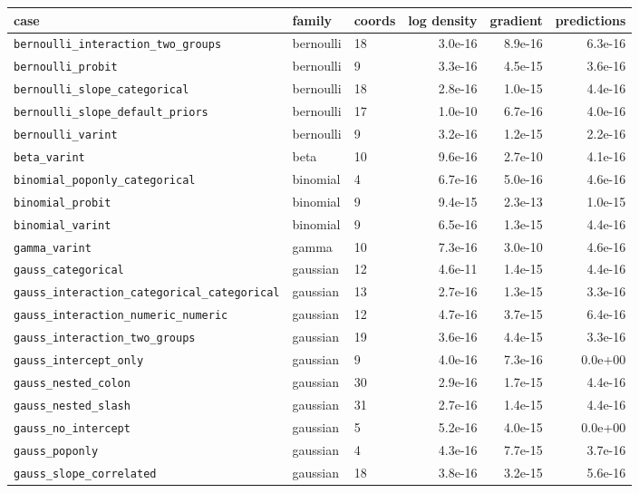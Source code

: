 \documentclass[11pt]{article}
\newcommand{\code}[1]{\texttt{#1}}
\begin{document}
\scriptsize\setlength{\tabcolsep}{4pt}
\begin{center}\begin{tabular}{@{}lllrrr@{}}
\toprule
case & family & coords & log density & gradient & predictions \\
\midrule
\code{bernoulli\_interaction\_two\_groups} & bernoulli & 18 & 3.0e-16 & 8.9e-16 & 6.3e-16 \\
\code{bernoulli\_probit} & bernoulli & 9 & 3.3e-16 & 4.5e-15 & 3.6e-16 \\
\code{bernoulli\_slope\_categorical} & bernoulli & 18 & 2.8e-16 & 1.0e-15 & 4.4e-16 \\
\code{bernoulli\_slope\_default\_priors} & bernoulli & 17 & 1.0e-10 & 6.7e-16 & 4.0e-16 \\
\code{bernoulli\_varint} & bernoulli & 9 & 3.2e-16 & 1.2e-15 & 2.2e-16 \\
\code{beta\_varint} & beta & 10 & 9.6e-16 & 2.7e-10 & 4.1e-16 \\
\code{binomial\_poponly\_categorical} & binomial & 4 & 6.7e-16 & 5.0e-16 & 4.6e-16 \\
\code{binomial\_probit} & binomial & 9 & 9.4e-15 & 2.3e-13 & 1.0e-15 \\
\code{binomial\_varint} & binomial & 9 & 6.5e-16 & 1.3e-15 & 4.4e-16 \\
\code{gamma\_varint} & gamma & 10 & 7.3e-16 & 3.0e-10 & 4.6e-16 \\
\code{gauss\_categorical} & gaussian & 12 & 4.6e-11 & 1.4e-15 & 4.4e-16 \\
\code{gauss\_interaction\_categorical\_categorical} & gaussian & 13 & 2.7e-16 & 1.3e-15 & 3.3e-16 \\
\code{gauss\_interaction\_numeric\_numeric} & gaussian & 12 & 4.7e-16 & 3.7e-15 & 6.4e-16 \\
\code{gauss\_interaction\_two\_groups} & gaussian & 19 & 3.6e-16 & 4.4e-15 & 3.3e-16 \\
\code{gauss\_intercept\_only} & gaussian & 9 & 4.0e-16 & 7.3e-16 & 0.0e+00 \\
\code{gauss\_nested\_colon} & gaussian & 30 & 2.9e-16 & 1.7e-15 & 4.4e-16 \\
\code{gauss\_nested\_slash} & gaussian & 31 & 2.7e-16 & 1.4e-15 & 4.4e-16 \\
\code{gauss\_no\_intercept} & gaussian & 5 & 5.2e-16 & 4.0e-15 & 0.0e+00 \\
\code{gauss\_poponly} & gaussian & 4 & 4.3e-16 & 7.7e-15 & 3.7e-16 \\
\code{gauss\_slope\_correlated} & gaussian & 18 & 3.8e-16 & 3.2e-15 & 5.6e-16 \\

\end{tabular}
\end{center}
\end{document}
